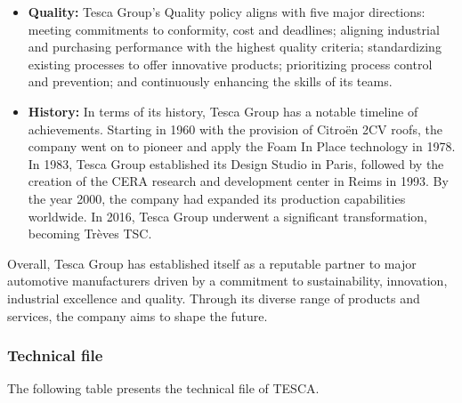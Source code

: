 \begin{itemize}

    \item \textbf{Quality:} Tesca Group's Quality policy aligns with five major directions: meeting commitments to conformity, cost and deadlines; aligning industrial and purchasing performance with the highest quality criteria; standardizing existing processes to offer innovative products; prioritizing process control and prevention; and continuously enhancing the skills of its teams\cite{tesca_official}.

\end{itemize}



\begin{itemize}

    \item \textbf{History:} In terms of its history, Tesca Group has a notable timeline of achievements. Starting in 1960 with the provision of Citro\"en 2CV roofs, the company went on to pioneer and apply the Foam In Place technology in 1978. In 1983, Tesca Group established its Design Studio in Paris, followed by the creation of the CERA research and development center in Reims in 1993. By the year 2000, the company had expanded its production capabilities worldwide. In 2016, Tesca Group underwent a significant transformation, becoming Tr\`eves TSC\cite{tesca_official}.

\end{itemize}



\hspace*{0.25cm}Overall, Tesca Group has established itself as a reputable partner to major automotive manufacturers
driven by a commitment to sustainability, innovation, industrial excellence and quality. Through its
diverse range of products and services, the company aims to shape the future\cite{tesca_official}.

\subsubsection{\fontsize{13}{16}\selectfont Technical file}

The following table presents the technical file of TESCA.

